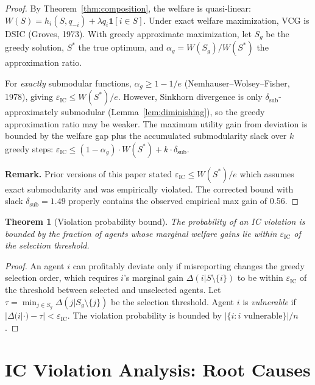 \documentclass[10pt]{article}
\newtheorem{theorem}{Theorem}
\begin{document}
\begin{proof}
By Theorem~\ref{thm:composition}, the welfare is quasi-linear: $W(S) = h_i(S, q_{-i}) + \lambda q_i \mathbf{1}[i \in S]$.
Under exact welfare maximization, VCG is DSIC (Groves, 1973).
With greedy approximate maximization, let $S_g$ be the greedy solution, $S^*$ the true optimum, and $\alpha_g = W(S_g)/W(S^*)$ the approximation ratio.

For \emph{exactly} submodular functions, $\alpha_g \geq 1-1/e$ (Nemhauser--Wolsey--Fisher, 1978), giving $\varepsilon_{\mathrm{IC}} \leq W(S^*)/e$.
However, Sinkhorn divergence is only $\delta_{\mathrm{sub}}$-approximately submodular (Lemma~\ref{lem:diminishing}), so the greedy approximation ratio may be weaker.
The maximum utility gain from deviation is bounded by the welfare gap plus the accumulated submodularity slack over $k$ greedy steps:
$\varepsilon_{\mathrm{IC}} \leq (1 - \alpha_g) \cdot W(S^*) + k \cdot \delta_{\mathrm{sub}}$.

\textbf{Remark.}
Prior versions of this paper stated $\varepsilon_{\mathrm{IC}} \leq W(S^*)/e$ which assumes exact submodularity and was empirically violated.
The corrected bound with slack $\delta_{\mathrm{sub}} = 1.49$ properly contains the observed empirical max gain of 0.56.
\end{proof}

\begin{theorem}[Violation probability bound]
\label{thm:viol-prob}
The probability of an IC violation is bounded by the fraction of agents whose marginal welfare gains lie within $\varepsilon_{\mathrm{IC}}$ of the selection threshold.
\end{theorem}

\begin{proof}
An agent $i$ can profitably deviate only if misreporting changes the greedy selection order, which requires $i$'s marginal gain $\Delta(i|S \setminus \{i\})$ to be within $\varepsilon_{\mathrm{IC}}$ of the threshold between selected and unselected agents.
Let $\tau = \min_{j \in S_g} \Delta(j|S_g \setminus \{j\})$ be the selection threshold.
Agent $i$ is \emph{vulnerable} if $|\Delta(i|\cdot) - \tau| < \varepsilon_{\mathrm{IC}}$.
The violation probability is bounded by $|\{i : i \text{ vulnerable}\}| / n$.
\end{proof}

\section{IC Violation Analysis: Root Causes}
\label{sec:ic-analysis}
\end{document}
